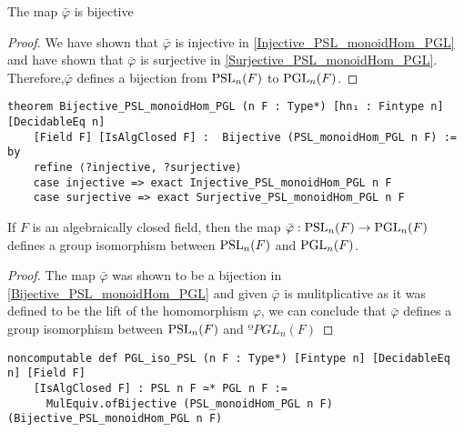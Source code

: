 \begin{lemma}
\label{Bijective_PSL_monoidHom_PGL}
\leanok
    The map $\bar{\varphi}$ is bijective
\end{lemma}
\begin{proof}
\leanok
 We have shown that $\bar{\varphi}$ is injective in \ref{Injective_PSL_monoidHom_PGL} and have shown that $\bar{\varphi}$ is surjective in \ref{Surjective_PSL_monoidHom_PGL}. 
 Therefore,$\bar{\varphi}$ defines a bijection from $\operatorname{PSL}_n(F)$ to $\operatorname{PGL}_n(F)$.
\end{proof}
\begin{footnotesize}
\begin{verbatim}
theorem Bijective_PSL_monoidHom_PGL (n F : Type*) [hn₁ : Fintype n] [DecidableEq n]
    [Field F] [IsAlgClosed F] :  Bijective (PSL_monoidHom_PGL n F) := by
    refine ⟨?injective, ?surjective⟩
    case injective => exact Injective_PSL_monoidHom_PGL n F
    case surjective => exact Surjective_PSL_monoidHom_PGL n F
\end{verbatim}
\end{footnotesize}

\begin{theorem}
\label{PGL_iso_PSL}
\leanok
    If $F$ is an algebraically closed field, then the map $\bar{\varphi} : \operatorname{PSL}_n(F) \rightarrow \operatorname{PGL}_n(F)$ defines a group isomorphism between $\operatorname{PSL}_n(F)$ and $\operatorname{PGL}_n(F)$.
\end{theorem}

\begin{proof}
\leanok
    The map $\bar{\varphi}$ was shown to be a bijection in \ref{Bijective_PSL_monoidHom_PGL} and given $\bar{\varphi}$ is mulitplicative as it was defined to be the lift of the homomorphism $\varphi$, we can conclude that 
    $\bar{\varphi}$ defines a group isomorphism between $\operatorname{PSL}_n(F)$ and $ºPGL_n(F)$
\end{proof}
\begin{footnotesize}
\begin{verbatim}
noncomputable def PGL_iso_PSL (n F : Type*) [Fintype n] [DecidableEq n] [Field F]
    [IsAlgClosed F] : PSL n F ≃* PGL n F :=
      MulEquiv.ofBijective (PSL_monoidHom_PGL n F) (Bijective_PSL_monoidHom_PGL n F)
\end{verbatim}
\end{footnotesize}

